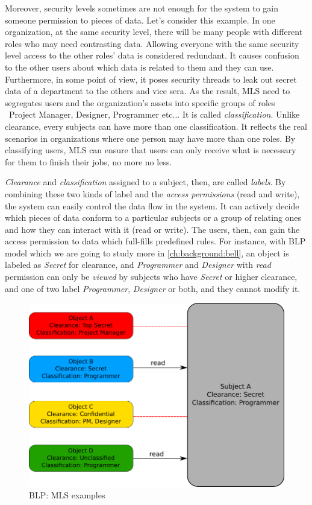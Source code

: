 Moreover, security levels sometimes are not enough for the system to gain someone permission to pieces of data.
Let's consider this example. 
In one organization, at the same security level, there will be many people with different roles who may need contrasting data.
Allowing everyone with the same security level access to the other roles' data is considered redundant.
It causes confusion to the other users about which data is related to them and they can use.
Furthermore, in some point of view, it poses security threads to leak out secret data of a department to the others and vice sera.
As the result, MLS need to segregates users and the organization's assets into specific groups of roles \eg\ Project Manager, Designer, Programmer etc...
It is called \emph{classification}.
Unlike clearance, every subjects can have more than one classification.
It reflects the real scenarios in organizations where one person may have more than one roles.
By classifying users, MLS can ensure that users can only receive what is necessary for them to finish their jobs, no more no less.

\emph{Clearance} and \emph{classification} assigned to a subject, then, are called \emph{labels}.
By combining these two kinds of label and the \emph{access permissions} (read and write), the system can easily control the data flow in the system.
It can actively decide which pieces of data conform to a particular subjects or a group of relating ones and how they can interact with it (read or write).
The users, then, can gain the access permission to data which full-fills predefined rules.
For instance, with BLP model which we are going to study more in \autoref{ch:background:bell}, an object is labeled as \emph{Secret} for clearance, and \emph{Programmer} and \emph{Designer} with \emph{read} permission can only be \emph{viewed} by subjects who have \emph{Secret} or higher clearance, and one of two label \emph{Programmer}, \emph{Designer} or both, and they cannot modify it.

\begin{figure}[bth]                                                                                                                                                  
\myfloatalign
\includegraphics[width=1.0\linewidth]{gfx/chapter_2/mls_example}
\caption[BLP: MLS examples]{BLP: MLS examples}\label{fig:mls_example}
\end{figure}

